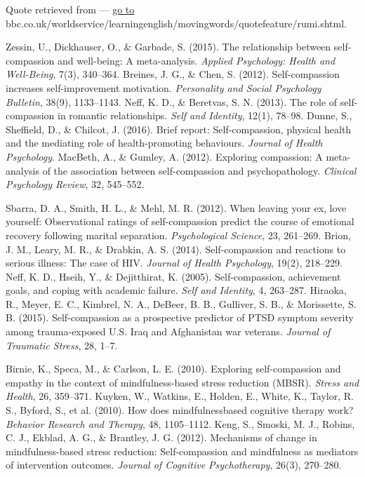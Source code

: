 
\begin{thebibliography}{999}
	
	 Quote retrieved from --- \href{www.bbc.co.uk/worldservice/learningenglish/movingwords/quotefeature/rumi.shtml}{go to}\\
	bbc.co.uk/worldservice/learningenglish/movingwords/quotefeature/rumi.shtml.
	
	 Zessin, U., Dickhauser, O., \& Garbade, S. (2015). The relationship between self-compassion and well-being: A meta-analysis. \textit{Applied Psychology: Health and Well-Being}, 7(3), 340–364.
	 Breines, J. G., \& Chen, S. (2012). Self-compassion increases self-improvement motivation. \textit{Personality and Social Psychology Bulletin}, 38(9), 1133–1143.
		Neff, K. D., \& Beretvas, S. N. (2013). The role of self-compassion in romantic relationships. \textit{Self and Identity}, 12(1), 78–98.
	 Dunne, S., Sheffield, D., \& Chilcot, J. (2016). Brief report: Self-compassion, physical health and the mediating role of health-promoting behaviours. \textit{Journal of Health Psychology}.
	 MacBeth, A., \& Gumley, A. (2012). Exploring compassion: A meta-analysis of the association between self-compassion and psychopathology. \textit{Clinical Psychology Review}, 32, 545–552.
	
	 Sbarra, D. A., Smith, H. L., \& Mehl, M. R. (2012). When leaving your ex, love yourself: Observational ratings of self-compassion predict the course of emotional recovery following marital separation. \textit{Psychological Science}, 23, 261–269.
	 Brion, J. M., Leary, M. R., \& Drabkin, A. S. (2014). Self-compassion and reactions to serious illness: The case of HIV. \textit{Journal of Health Psychology}, 19(2), 218–229.
	 Neff, K. D., Hseih, Y., \& Dejitthirat, K. (2005). Self-compassion, achievement goals, and coping with academic failure. \textit{Self and Identity}, 4, 263–287.
	 Hiraoka, R., Meyer, E. C., Kimbrel, N. A., DeBeer, B. B., Gulliver, S. B., \& Morissette, S. B. (2015). Self-compassion as a prospective predictor of PTSD symptom severity among trauma-exposed U.S. Iraq and Afghanistan war veterans. \textit{Journal of Traumatic Stress}, 28, 1–7.
	
	 Birnie, K., Speca, M., \& Carlson, L. E. (2010). Exploring self-compassion and empathy in the context of mindfulness-based stress reduction (MBSR). \textit{Stress and Health}, 26, 359–371.
	 Kuyken, W., Watkins, E., Holden, E., White, K., Taylor, R. S., Byford, S., et al. (2010). How does mindfulnessbased cognitive therapy work? \textit{Behavior Research and Therapy}, 48, 1105–1112.
	 Keng, S., Smoski, M. J., Robins, C. J., Ekblad, A. G., \& Brantley, J. G. (2012). Mechanisms of change in mindfulness-based stress reduction: Self-compassion and mindfulness as mediators of intervention outcomes. \textit{Journal of Cognitive Psychotherapy}, 26(3), 270–280.
	

\end{thebibliography}
